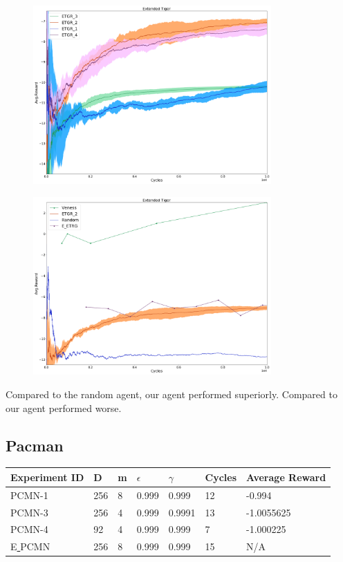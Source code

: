 \documentclass{article}
\theoremstyle{definition}
\newtheorem{primary statistics}[definition]{Primary Statistics}
\newtheorem{auxiliary statistics}[definition]{Auxiliary Statistics}
\begin{document}
 \begin{figure}[h]
 \centering
    \includegraphics[width=9.1cm]{4_Extended_Tiger}
\end{figure}

 \begin{figure}[h]
 \centering
    \includegraphics[width=9.1cm]{Extended_Tiger}
\end{figure}

Compared to the random agent, our agent performed superiorly. Compared to \citep{veness2011monte} our agent performed worse.

\newpage

\subsection{Pacman}
 \begin{tabular}{|l|l|l|l|l|l|l|}
 \hline \centering
 Experiment ID& D & m & $\epsilon$ & $\gamma$ & Cycles & Average Reward \\ \hline
PCMN-1  & 256       & 8           & 0.999       & 0.999             & 12     & -0.994        \\ \hline
 PCMN-3    & 256       & 4           & 0.999       & 0.9991            & 13     & -1.0055625       \\ \hline
 PCMN-4     & 92        & 4           & 0.999       & 0.999             & 7      &    -1.000225    \\  \hline 
  E\underline{ }PCMN    & 256        & 8           & 0.999       & 0.999             & 15      &    N/A    \\  \hline     
\end{tabular} \\
\end{document}
